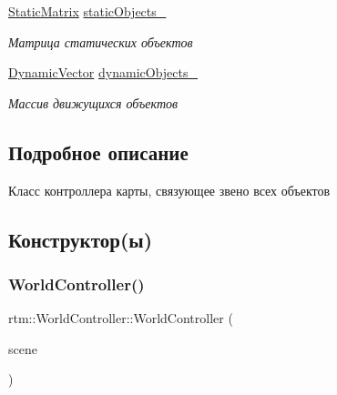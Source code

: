\begin{DoxyCompactItemize}
\mbox{\label{classrtm_1_1_world_controller_a4d8e2a139009da1c96d4645709379687}} 
\hyperlink{namespacertm_ad5f25e2b28cb92f41fe991faa7fcdd30}{Static\+Matrix} \hyperlink{classrtm_1_1_world_controller_a4d8e2a139009da1c96d4645709379687}{static\+Objects\+\_\+}
\begin{DoxyCompactList}\small\item\em Матрица статических объектов \end{DoxyCompactList}\item 
\mbox{\label{classrtm_1_1_world_controller_a595fed30f15d5f5eee51aa5d829abc7e}} 
\hyperlink{namespacertm_a7fb21a6bf2f6f5947e2875093824c144}{Dynamic\+Vector} \hyperlink{classrtm_1_1_world_controller_a595fed30f15d5f5eee51aa5d829abc7e}{dynamic\+Objects\+\_\+}
\begin{DoxyCompactList}\small\item\em Массив движущихся объектов \end{DoxyCompactList}\end{DoxyCompactItemize}


\subsection{Подробное описание}
Класс контроллера карты, связующее звено всех объектов 

\subsection{Конструктор(ы)}
\mbox{\label{classrtm_1_1_world_controller_a6c7b626c306b63f5799ed3b37e7de7a4}} 
\subsubsection{\texorpdfstring{World\+Controller()}{WorldController()}\hspace{0.1cm}{\footnotesize\ttfamily [1/3]}}
{\footnotesize\ttfamily rtm\+::\+World\+Controller\+::\+World\+Controller (\begin{DoxyParamCaption}\item[{\hyperlink{classrtm_1_1_world_scene}{World\+Scene} $\ast$const}]{scene }\end{DoxyParamCaption})}

